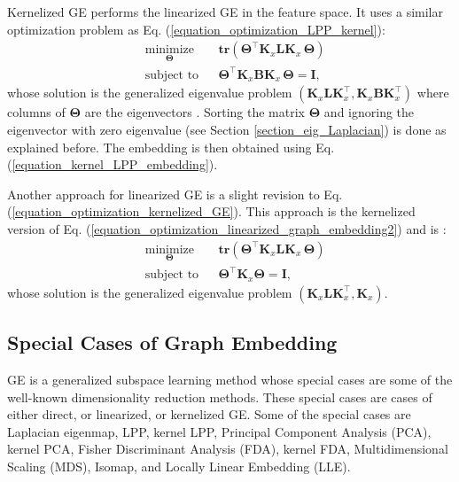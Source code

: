 \documentclass[lang=cn,10pt]{gorgeousnbook}
\numberwithin{equation}{section}%
\numberwithin{figure}{section}%
\begin{document}
Kernelized GE \cite{yan2005graph,yan2006graph} performs the linearized GE in the feature space. It uses a similar optimization problem as Eq. (\ref{equation_optimization_LPP_kernel}):
\begin{equation}\label{equation_optimization_kernelized_GE}
\begin{aligned}
& \underset{\boldsymbol{\Theta}}{\text{minimize}}
& & \textbf{tr}(\boldsymbol{\Theta}^\top \boldsymbol{K}_x \boldsymbol{L} \boldsymbol{K}_x\, \boldsymbol{\Theta}) \\
& \text{subject to}
& & 
\boldsymbol{\Theta}^\top \boldsymbol{K}_x \boldsymbol{B} \boldsymbol{K}_x\, \boldsymbol{\Theta} = \boldsymbol{I},
\end{aligned}
\end{equation}
whose solution is the generalized eigenvalue problem $(\boldsymbol{K}_x \boldsymbol{L} \boldsymbol{K}_x^\top, \boldsymbol{K}_x \boldsymbol{B} \boldsymbol{K}_x^\top)$ where columns of $\boldsymbol{\Theta}$ are the eigenvectors \cite{ghojogh2019eigenvalue}.
Sorting the matrix $\boldsymbol{\Theta}$ and ignoring the eigenvector with zero eigenvalue (see Section \ref{section_eig_Laplacian}) is done as explained before. The embedding is then obtained using Eq. (\ref{equation_kernel_LPP_embedding}). 

Another approach for linearized GE is a slight revision to Eq. (\ref{equation_optimization_kernelized_GE}). 
This approach is the kernelized version of Eq. (\ref{equation_optimization_linearized_graph_embedding2}) and is \cite{yan2005graph}:
\begin{equation}\label{equation_optimization_kernelized_GE_2}
\begin{aligned}
& \underset{\boldsymbol{\Theta}}{\text{minimize}}
& & \textbf{tr}(\boldsymbol{\Theta}^\top \boldsymbol{K}_x \boldsymbol{L} \boldsymbol{K}_x\, \boldsymbol{\Theta}) \\
& \text{subject to}
& & 
\boldsymbol{\Theta}^\top \boldsymbol{K}_x \boldsymbol{\Theta} = \boldsymbol{I},
\end{aligned}
\end{equation}
whose solution is the generalized eigenvalue problem $(\boldsymbol{K}_x \boldsymbol{L} \boldsymbol{K}_x^\top, \boldsymbol{K}_x)$.

\subsection{Special Cases of Graph Embedding}

GE is a generalized subspace learning method whose special cases are some of the well-known dimensionality reduction methods. These special cases are cases of either direct, or linearized, or kernelized GE. Some of the special cases are Laplacian eigenmap, LPP, kernel LPP, Principal Component Analysis (PCA), kernel PCA, Fisher Discriminant Analysis (FDA), kernel FDA, Multidimensional Scaling (MDS), Isomap, and Locally Linear Embedding (LLE). 
\end{document}

